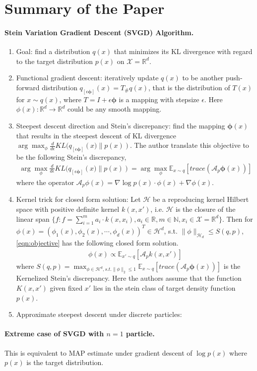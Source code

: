 \section{Summary of the Paper}

\paragraph{Stein Variation Gradient Descent (SVGD) Algorithm.}

\begin{enumerate}
    \item Goal: find a distribution $q(x)$ that minimizes its KL divergence with regard to the target distribution $p(x)$ on $\mathcal{X}=\mathbb{R}^d$.
    \item Functional gradient descent: iteratively update $q(x)$ to be another push-forward distribution $q_{[\epsilon\mathbf{\phi}]}(x) = T_{\#}q(x)$, that is the distribution of $T(x)$ for $x\sim q(x)$, where $T= I + \epsilon \mathbf{\phi}$ is a mapping with stepsize $\epsilon$. Here $\phi(x): \mathbb{R}^d\rightarrow \mathbb{R}^d$ could be any smooth mapping.
    \item Steepest descent direction and Stein's discrepancy: find the mapping $\mathbf{\phi}(x)$ that results in the steepest descent of KL divergence $\arg\max_{\phi} \frac{d}{d \epsilon} KL(q_{[\epsilon\mathbf{\phi}]}\left(x)\lVert p(x)\right)$. The author translate this objective to be the following Stein's discrepancy,
    \begin{align}
    \label{eqn:objective}
         \arg\max_\phi\frac{d}{d \epsilon}KL(q_{[\epsilon\mathbf{\phi}]}\left(x)\lVert p(x)\right) = \arg\max_\phi \mathbb{E}_{x\sim q}\left[trace\left(\mathcal{A}_p \mathbf{\phi}(x)\right)\right]
    \end{align}
    where the operator $\mathcal{A}_p \phi(x)= \nabla \log p(x) \cdot \phi(x) + \nabla\phi(x)$.
    \item Kernel trick for closed form solution: Let $\mathcal{H}$ be a reproducing kernel Hilbert space with positive definite kernel $k(x,x')$, i.e. $\mathcal{H}$ is the closure of the linear span $\{f: f = \sum_{i=1}^m a_i \cdot k(x, x_i), a_i\in \mathbb{R}, m\in \mathbb{N}, x_i\in \mathcal{X}=\mathbb{R}^d \}$. Then for $\phi(x) = \left(\phi_1(x), \phi_2(x), \cdots, \phi_d(x)\right)^T \in \mathcal{H}^d$, s.t. $\lVert\phi\rVert_{\mathcal{H}_d}\leq S(q, p)$, \eqref{eqn:objective}  has the following closed form solution.
    \begin{align}
    \label{eqn:solution}
        \phi(x) \propto \mathbb{E}_{x'\sim q}\left[ \mathcal{A}_p k(x, x') \right]
    \end{align}
    where $S(q, p) = \max_{\phi\in \mathcal{H}^d, s.t. \lVert\phi\rVert_2\leq 1} \mathbb{E}_{x\sim q}\left[trace\left(\mathcal{A}_p \mathbf{\phi}(x)\right)\right]$ is the Kernelized Stein's discrepancy. Here the authors assume that the function $K(x, x')$ given fixed $x'$ lies in the stein class of target density function $p(x)$.
    \item Approximate steepest descent under discrete particles: 
    
\end{enumerate}


\paragraph{Extreme case of SVGD with $n=1$ particle.} This is equivalent to MAP estimate under gradient descent of $\log p(x)$ where $p(x)$ is the target distribution.